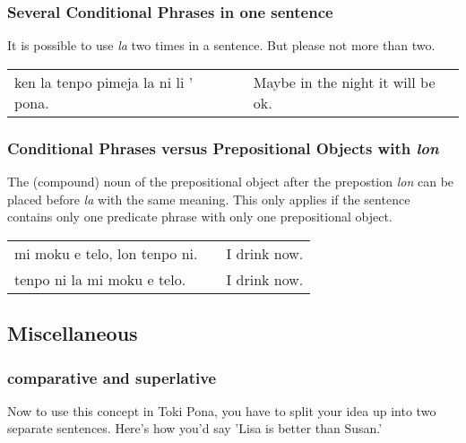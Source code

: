 \subsubsection*{Several Conditional Phrases in one sentence}
%
It is possible to use \textit{la} two times in a sentence. 
But please not more than two. 

\begin{supertabular}{p{5,5cm}|ll}
ken la tenpo pimeja la ni li ' pona. && Maybe in the night it will be ok. \\  
\end{supertabular} 

%
\subsubsection*{Conditional Phrases versus Prepositional Objects with \textit{lon} }
%
The (compound) noun of the prepositional object after the prepostion \textit{lon} can be placed before \textit{la} with the same meaning.
This only applies if the sentence contains only one predicate phrase with only one prepositional object. 

\begin{supertabular}{p{5,5cm}|ll}
mi moku e telo, lon tenpo ni. && I drink now. \\
tenpo ni la mi moku e telo.  && I drink now. \\
\end{supertabular} 

%
\newpage
{}
\subsection*{Miscellaneous}
\subsubsection*{comparative and superlative} 
%
Now to use this concept in Toki Pona, you have to split your idea up into two separate sentences. 
Here's how you'd say 'Lisa is better than Susan.'

